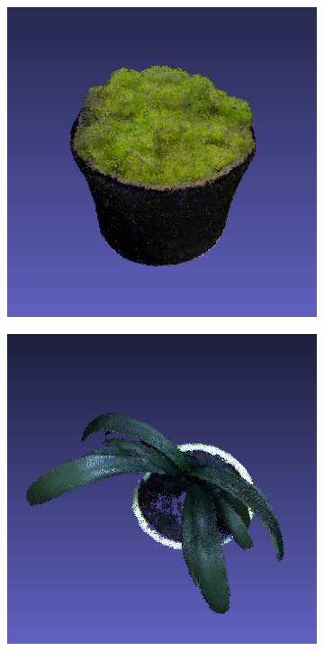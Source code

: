 \documentclass[letterpaper, 10 pt, conference]{ieeeconf}  %
\begin{document}
\begin{figure}[th]
        
        \begin{subfigure}[b]{0.5\linewidth}
                \centering
                \includegraphics[width=\linewidth]{../models/plant.png}
        \end{subfigure}%
        \begin{subfigure}[b]{0.5\linewidth}
                \centering
                \includegraphics[width=\linewidth]{../models/clivia.png}
        \end{subfigure}
        

\end{figure}
\end{document}
